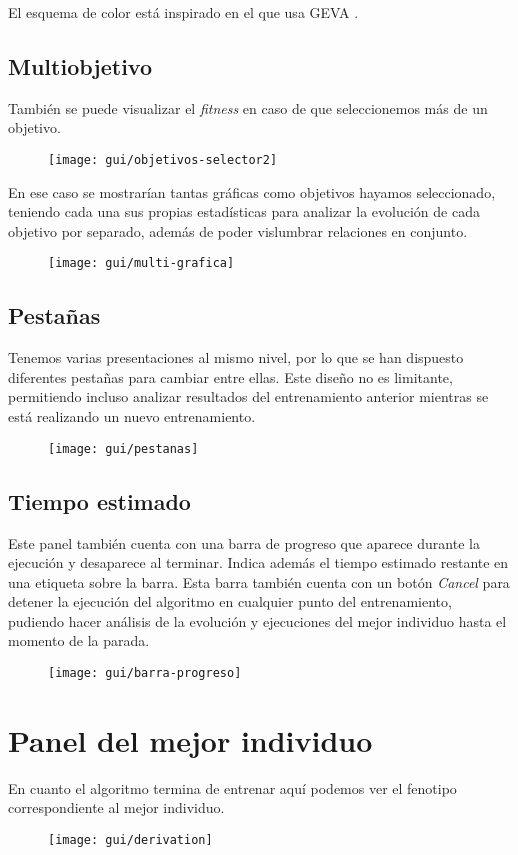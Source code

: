 El esquema de color está inspirado en el que usa GEVA \cite{gevaGit}.

\subsection{Multiobjetivo}
También se puede visualizar el \textit{fitness} en caso de que seleccionemos más de un objetivo.
\begin{figure}[H]
\centering
\texttt{[image: gui/objetivos-selector2]}
\end{figure}

En ese caso se mostrarían tantas gráficas como objetivos hayamos seleccionado, teniendo cada una sus propias estadísticas para analizar la evolución de cada objetivo por separado, además de poder vislumbrar relaciones en conjunto.
\begin{figure}[H]
\centering
\texttt{[image: gui/multi-grafica]}
\end{figure}

\subsection{Pestañas}
Tenemos varias presentaciones al mismo nivel, por lo que se han dispuesto diferentes pestañas para cambiar entre ellas. Este diseño no es limitante, permitiendo incluso analizar resultados del entrenamiento anterior mientras se está realizando un nuevo entrenamiento.
\begin{figure}[H]
\centering
\texttt{[image: gui/pestanas]}
\end{figure}

\subsection{Tiempo estimado}
Este panel también cuenta con una barra de progreso que aparece durante la ejecución y desaparece al terminar. Indica además el tiempo estimado restante en una etiqueta sobre la barra. Esta barra también cuenta con un botón \textit{Cancel} para detener la ejecución del algoritmo en cualquier punto del entrenamiento, pudiendo hacer análisis de la evolución y ejecuciones del mejor individuo hasta el momento de la parada.
\begin{figure}[H]
\centering
\texttt{[image: gui/barra-progreso]}
\end{figure}

\section{Panel del mejor individuo}
En cuanto el algoritmo termina de entrenar aquí podemos ver el fenotipo correspondiente al mejor individuo.
\begin{figure}[H]
\centering
\texttt{[image: gui/derivation]}
\end{figure}

